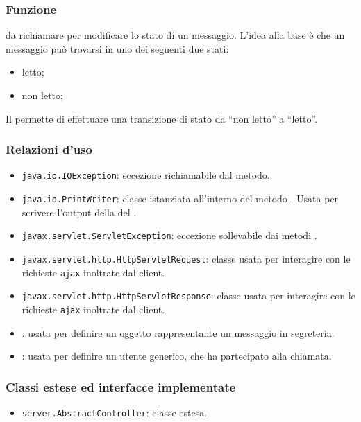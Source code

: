 \subsubsection*{Funzione}
 da richiamare per modificare lo stato di un messaggio. L'idea alla base è che un messaggio può trovarsi in uno dei seguenti due stati:
\begin{itemize}
	\item letto;
	\item non letto;
\end{itemize}
Il  permette di effettuare una transizione di stato da ``non letto'' a ``letto''.

\subsubsection*{Relazioni d'uso}
\begin{itemize}
	\item \texttt{java.io.IOException}: eccezione richiamabile dal metodo.
	\item \texttt{java.io.PrintWriter}: classe istanziata all'interno del metodo . Usata per scrivere l'output della del .
	\item \texttt{javax.servlet.ServletException}: eccezione sollevabile dai metodi .
	\item \texttt{javax.servlet.http.HttpServletRequest}: classe usata per interagire con le richieste \texttt{ajax} inoltrate dal client.
	\item \texttt{javax.servlet.http.HttpServletResponse}: classe usata per interagire con le richieste \texttt{ajax} inoltrate dal client.
	\item {}: usata per definire un oggetto rappresentante un messaggio in segreteria.
	\item {}: usata per definire un utente generico, che ha partecipato alla chiamata.
\end{itemize}

\subsubsection*{Classi estese ed interfacce implementate}
\begin{itemize}
	\item \texttt{server.AbstractController}: classe estesa.
\end{itemize}

